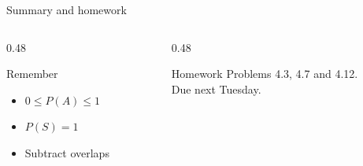 \documentclass{beamer}
\begin{document}
\begin{frame}{Summary and homework}
  \begin{columns}[T]
    \begin{column}{0.48\textwidth}
      \begin{block}{Remember}
        \begin{itemize}
          \item $0 \le P(A) \le 1$
          \item $P(S) = 1$
          \item Subtract overlaps
        \end{itemize}
      \end{block}
    \end{column}
    \begin{column}{0.48\textwidth}
      \begin{block}{Homework}
        Problems 4.3, 4.7 and 4.12.\\
        Due next Tuesday.
      \end{block}
    \end{column}
  \end{columns}
\end{frame}
\end{document}
